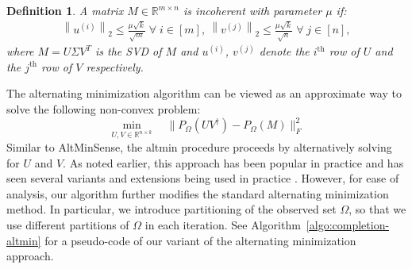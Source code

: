 \documentclass[11pt]{article}
\theoremstyle{plain}
\newtheorem{definition}[theorem]{Definition}
\theoremstyle{definition}
\newcommand{\rmn}{\mathbb{R}^{m \times n}}
\newcommand{\R}{\mathbb{R}}
\newcommand{\twonorm}[1]{\left\| {#1} \right\|_2}
\newcommand{\as}{AltMinSense\ }
\newcommand{\ase}{AltMinSense}
\begin{document}
\begin{definition}\cite{CandesR2007}\label{defn:sampling-incoherentmatrices}
A matrix $M\in \rmn$ is incoherent with parameter $\mu$ if:%
\begin{align}\label{eqn:sampling-incoherentmatrices}
  \twonorm{u^{(i)}} \leq \frac{\mu \sqrt{k}}{\sqrt{m}} \;\forall\;i \in [m],\  \twonorm{v^{(j)}} \leq \frac{\mu \sqrt{k}}{\sqrt{n}} \;\forall\;j \in [n],%
\end{align}
where $M=U\Sigma V^T$ is the SVD of $M$ and $u^{(i)}$, $v^{(j)}$ denote the $i^{\textrm{th}}$ row of $U$
and the $j^{\textrm{th}}$ row of $V$ respectively.
\end{definition}
The alternating minimization algorithm can be viewed as an approximate way to solve the following non-convex problem:
\[
\min_{U,V\in \mathbb{R}^{n\times k}}  \quad  \| P_\Omega(UV^\dag) - P_\Omega(M)\|^2_F 
\]
Similar to \ase, the altmin procedure proceeds by alternatively solving for $U$ and $V$.  As noted earlier, this approach has been popular in practice and has seen several variants and extensions being used in practice \cite{Zhouetal08,KorenBV09,Koren09,chen2012matrix}. However, for ease of analysis, our algorithm further modifies the standard alternating minimization method. In particular, we introduce  partitioning of the observed set $\Omega$, so that we use different partitions of $\Omega$ in each iteration. See Algorithm~\ref{algo:completion-altmin} for a pseudo-code of our variant of the alternating minimization approach.
\end{document}
